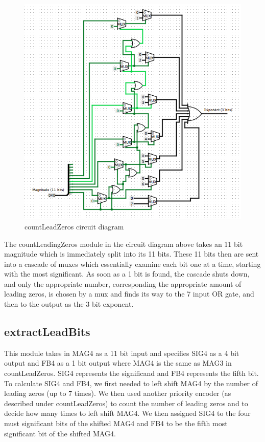 \documentclass{article}
\begin{document}
\begin{figure}[H]
	\begin{center}
		\includegraphics[width=1\textwidth]{countLeadingZerosCircuitD.png} 
		\caption{countLeadZeros circuit diagram}
	\end{center}
\end{figure}

The countLeadingZeros module in the circuit diagram above takes an 11 bit magnitude which is immediately split into its 11 bits.  These 11 bits then are sent into a cascade of muxes which essentially examine each bit one at a time, starting with the most significant.  As soon as a 1 bit is found, the cascade shuts down, and only the appropriate number, corresponding the appropriate amount of leading zeros, is chosen by a mux and finds its way to the 7 input OR gate, and then to the output as the 3 bit exponent.

\subsection*{extractLeadBits}
This module takes in MAG4 as a 11 bit input and specifies SIG4 as a 4 bit output and FB4 as a 1 bit output where MAG4 is the same as MAG3 in countLeadZeros. SIG4 represents the significand and FB4 represents the fifth bit. To calculate SIG4 and FB4, we first needed to left shift MAG4 by the number of leading zeros (up to 7 times). We then used another priority encoder (as described under countLeadZeros) to count the number of leading zeros and to decide how many times to left shift MAG4. We then assigned SIG4 to the four must significant bits of the shifted MAG4 and FB4 to be the fifth most significant bit of the shifted MAG4.
\end{document}
